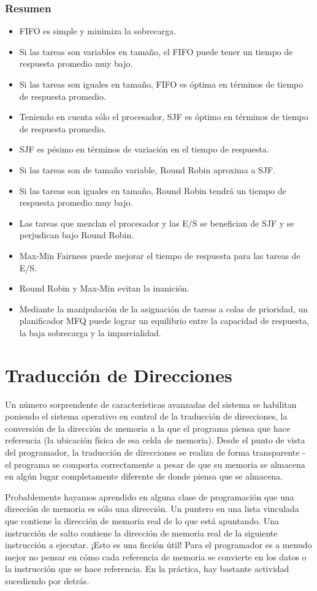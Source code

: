 \documentclass[10pt]{book}
\begin{document}
\subsection{Resumen}
\begin{itemize}
\item FIFO es simple y minimiza la sobrecarga.
\item Si las tareas son variables en tamaño, el FIFO puede tener un tiempo de respuesta promedio muy bajo.
\item Si las tareas son iguales en tamaño, FIFO es óptima en términos de tiempo de respuesta promedio.
\item Teniendo en cuenta sólo el procesador, SJF es óptimo en términos de tiempo de respuesta promedio.
\item SJF es pésimo en términos de variación en el tiempo de respuesta.
\item Si las tareas son de tamaño variable, Round Robin aproxima a SJF.
\item Si las tareas son iguales en tamaño, Round Robin tendrá un tiempo de respuesta promedio muy bajo.
\item Las tareas que mezclan el procesador y las E/S se benefician de SJF y se perjudican bajo Round Robin.
\item Max-Min Fairness puede mejorar el tiempo de respuesta para las tareas de E/S.
\item Round Robin y Max-Min evitan la inanición.
\item Mediante la manipulación de la asignación de tareas a colas de prioridad, un planificador MFQ puede lograr un equilibrio entre la capacidad de respuesta, la baja sobrecarga y la imparcialidad.
\end{itemize}

\chapter{Traducción de Direcciones}
Un número sorprendente de características avanzadas del sistema se habilitan poniendo el sistema operativo en control de la traducción de direcciones, la conversión de la dirección de memoria a la que el programa piensa que hace referencia (la ubicación física de esa celda de memoria). Desde el punto de vista del programador, la traducción de direcciones se realiza de forma transparente - el programa se comporta correctamente a pesar de que su memoria se almacena en algún lugar completamente diferente de donde piensa que se almacena.

Probablemente hayamos aprendido en alguna clase de programación que una dirección de memoria es sólo una dirección. Un puntero en una lista vinculada que contiene la dirección de memoria real de lo que está apuntando. Una instrucción de salto contiene la dirección de memoria real de la siguiente instrucción a ejecutar. ¡Esto es una ficción útil! Para el programador es a menudo mejor no pensar en cómo cada referencia de memoria se convierte en los datos o la instrucción que se hace referencia. En la práctica, hay bastante actividad sucediendo por detrás.
\end{document}
